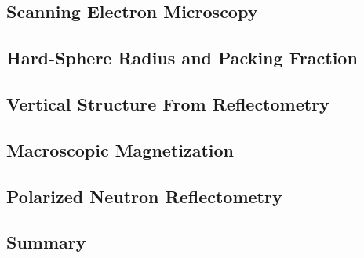 \documentclass[\main/dresen_thesis.tex]{subfiles}
\renewcommand{\thisPath}{\main/chapters/looselyPackedNS/structure}
\begin{document}
  \subsection{Scanning Electron Microscopy}
  
    \FloatBarrier

  \subsection{Hard-Sphere Radius and Packing Fraction}
  
    \FloatBarrier

  \subsection{Vertical Structure From Reflectometry}
  
    \FloatBarrier

  \subsection{Macroscopic Magnetization}
  
    \FloatBarrier

  \subsection{Polarized Neutron Reflectometry}
  
    \FloatBarrier

  \subsection{Summary}
  
    \FloatBarrier
\end{document}
